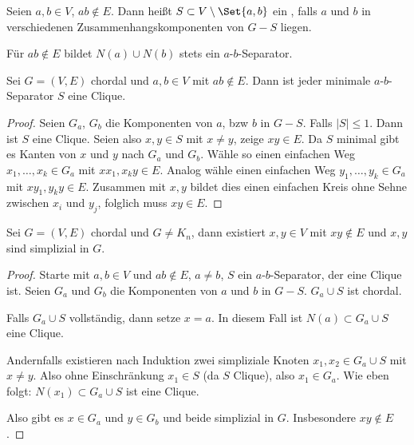 \begin{df}
    Seien $a, b \in V$, $ab \not\in E$.
    Dann heißt $S \subset V \setminus \Set{a,b}$ ein , falls $a$ und $b$ in verschiedenen Zusammenhangskomponenten von $G - S$ liegen.
    \begin{note}
        Für $ab \not\in E$ bildet
        $N(a) \cup N(b)$ stets ein $a$-$b$-Separator.
    \end{note}
\end{df}

\begin{st}
    Sei $G = (V, E)$ chordal und $a, b \in V$ mit $ab \not\in E$.
    Dann ist jeder minimale $a$-$b$-Separator $S$ eine Clique.
    \begin{proof}
        Seien $G_a$, $G_b$ die Komponenten von $a$, bzw $b$ in $G - S$.
        Falls $|S| \le 1$.
        Dann ist $S$ eine Clique.
        Seien also $x, y \in S$ mit $x \neq y$, zeige $xy \in E$.
        Da $S$ minimal gibt es Kanten von $x$ und $y$ nach $G_a$ und $G_b$.
        Wähle so einen einfachen Weg $x_1, \dotsc, x_k \in G_a$ mit $xx_1, x_ky \in E$.
        Analog wähle einen einfachen Weg $y_1, \dotsc, y_k \in G_a$ mit $xy_1, y_ky \in E$.
        Zusammen mit $x,y$ bildet dies einen einfachen Kreis ohne Sehne zwischen $x_i$ und $y_j$, folglich muss $xy \in E$.
    \end{proof}
\end{st}


\begin{lem}
    Sei $G = (V, E)$ chordal und $G \neq K_n$, dann existiert $x,y \in V$ mit $xy \not\in E$ und $x,y$ sind simplizial in $G$.
    \begin{proof}
        Starte mit $a,b \in V$ und $ab \not\in E$, $a \neq b$, $S$ ein $a$-$b$-Separator, der eine Clique ist.
        Seien $G_a$ und $G_b$ die Komponenten von $a$ und $b$ in $G - S$.
        $G_a \cup S$ ist chordal.

        Falls $G_a \cup S$ vollständig, dann setze $x = a$.
        In diesem Fall ist $N(a) \subset G_a \cup S$ eine Clique.

        Andernfalls existieren nach Induktion zwei simpliziale Knoten $x_1, x_2 \in G_a \cup S$ mit $x \neq y$.
        Also ohne Einschränkung $x_1 \in S$ (da $S$ Clique), also $x_1 \in G_a$.
        Wie eben folgt: $N(x_1) \subset G_a \cup S$ ist eine Clique.

        Also gibt es $x \in G_a$ und $y \in G_b$ und beide simplizial in $G$.
        Insbesondere $xy \not\in E$.
    \end{proof}
\end{lem}


